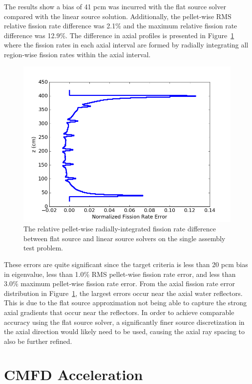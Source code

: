 The results show a bias of 41 pcm was incurred with the flat source solver compared with the linear source solution. Additionally, the pellet-wise RMS relative fission rate difference was 2.1\% and the maximum relative fission rate difference was 12.9\%. The difference in axial profiles is presented in Figure~\ref{fig:fs-ls-axial-diff} where the fission rates in each axial interval are formed by radially integrating all region-wise fission rates within the axial interval.

\begin{figure}[h!]
	\centering
	\includegraphics[width=0.7\linewidth]{figures/results/error-plots/sa_fs_axial_error.png}
	\caption[]{The relative pellet-wise radially-integrated fission rate difference between flat source and linear source solvers on the single assembly test problem.}
	\label{fig:fs-ls-axial-diff}
\end{figure}

These errors are quite significant since the target criteria is less than 20 pcm bias in eigenvalue, less than 1.0\% RMS pellet-wise fission rate error, and less than 3.0\% maximum pellet-wise fission rate error. From the axial fission rate error distribution in Figure~\ref{fig:fs-ls-axial-diff}, the largest errors occur near the axial water reflectors. This is due to the flat source approximation not being able to capture the strong axial gradients that occur near the reflectors. In order to achieve comparable accuracy using the flat source solver, a significantly finer source discretization in the axial direction would likely need to be used, causing the axial ray spacing to also be further refined. 

\section{CMFD Acceleration}
\label{sec:cmfd-convergence-params}

